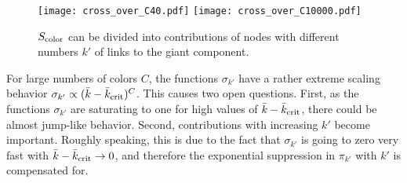 \documentclass[aps, pre, onecolumn, a4paper, floatfix]{revtex4}
\begin{document}
\begin{figure}[htb]
    \texttt{[image: cross\_over\_C40.pdf]}
    \texttt{[image: cross\_over\_C10000.pdf]}\\
    \caption{$S_{\rm color}$ can be divided into contributions of nodes with different numbers 
    $k'$ of links to the giant component.}
    \label{fig:1}
\end{figure}
%
For large numbers of colors $C$, the functions $\sigma_{k'}$ have a rather extreme scaling 
behavior $\sigma_{k'} \propto (\bar{k}-{\bar k}_{\rm crit})^C$. This causes two open 
questions. First, as the functions $\sigma_{k'}$ are saturating to one for high 
values of $\bar{k}-{\bar k}_{\rm crit}$, there could be almost jump-like behavior. 
Second, contributions with increasing $k'$ become important. Roughly speaking, this is due 
to the fact that $\sigma_{k'}$ is going to zero very fast with $\bar{k}-{\bar k}_{\rm crit}\to 0$, 
and therefore the exponential suppression in $\pi_{k'}$ with $k'$ is compensated for. 
\end{document}
